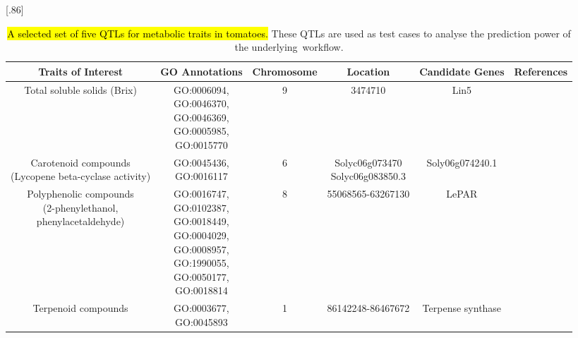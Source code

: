 \documentclass[applsci,article,accept,moreauthors,pdftex]{Definitions/mdpi}
\begin{document}
{\begin{table}[H]
\centering
\caption{\hl{A selected set of %
 five QTLs for metabolic traits in tomatoes.} These QTLs %
 are used as test cases to analyse the prediction power of the underlying~workflow.}
\label{c5:tab1}
{
{
\scalebox{.86}[.86]{\begin{tabular}{c  c  c  c  c  c }
\toprule
\textbf{Traits of Interest} & \textbf{GO Annotations} & \textbf{Chromosome} & \textbf{Location} & \textbf{Candidate Genes} & \textbf{References} \\
\midrule
Total soluble solids (Brix) & \makecell{ GO:0006094, \\ GO:0046370, \\ GO:0046369, \\ GO:0005985, \\ GO:0015770 } &    9 &    3474710 &    Lin5 & \cite{fridman2002two} \\    %
\midrule
\makecell{Carotenoid compounds\\ (Lycopene beta-cyclase activity)} & \makecell{ GO:0045436, \\
GO:0016117} & 6 & \makecell{Solyc06g073470\\ Solyc06g083850.3} & Soly06g074240.1 & \cite{bouvier2000identification} \\ %
\midrule
\makecell{Polyphenolic compounds\\ (2-phenylethanol,\\ phenylacetaldehyde)} %
&    \makecell{ GO:0016747, \\ GO:0102387, \\ GO:0018449, \\ GO:0004029, \\ GO:0008957, \\ GO:1990055, \\ GO:0050177, \\ GO:0018814} & 8 &    55068565-63267130 &    LePAR%
& \cite{tadmor2002identification}\\    %
\midrule
Terpenoid compounds & \makecell{ GO:0003677, \\ GO:0045893} & 1 & 86142248-86467672 & Terpense synthase & \cite{falara2011tomato} \\    %

\end{tabular}}}}
\end{table}}
\end{document}
